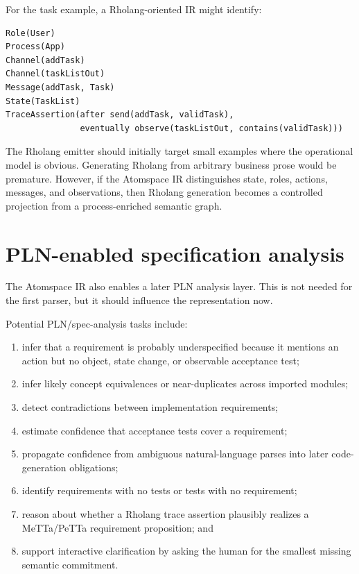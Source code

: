 \documentclass[11pt]{article}
\begin{document}
For the task example, a Rholang-oriented IR might identify:
\begin{verbatim}
Role(User)
Process(App)
Channel(addTask)
Channel(taskListOut)
Message(addTask, Task)
State(TaskList)
TraceAssertion(after send(addTask, validTask),
               eventually observe(taskListOut, contains(validTask)))
\end{verbatim}

The Rholang emitter should initially target small examples where the operational
model is obvious.  Generating Rholang from arbitrary business prose would be
premature.  However, if the Atomspace IR distinguishes state, roles, actions,
messages, and observations, then Rholang generation becomes a controlled
projection from a process-enriched semantic graph.

\section{PLN-enabled specification analysis}

The Atomspace IR also enables a later PLN analysis layer.  This is not needed
for the first parser, but it should influence the representation now.

Potential PLN/spec-analysis tasks include:
\begin{enumerate}
  \item infer that a requirement is probably underspecified because it mentions
        an action but no object, state change, or observable acceptance test;
  \item infer likely concept equivalences or near-duplicates across imported
        modules;
  \item detect contradictions between implementation requirements;
  \item estimate confidence that acceptance tests cover a requirement;
  \item propagate confidence from ambiguous natural-language parses into later
        code-generation obligations;
  \item identify requirements with no tests or tests with no requirement;
  \item reason about whether a Rholang trace assertion plausibly realizes a
        MeTTa/PeTTa requirement proposition; and
  \item support interactive clarification by asking the human for the smallest
        missing semantic commitment.
\end{enumerate}
\end{document}
